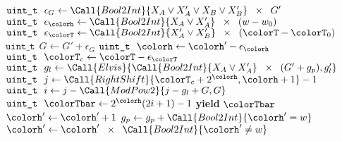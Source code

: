\begin{algorithm}[H]
\begin{minipage}{0.55\textwidth}
\begin{algorithmic}[1]
        \Statex
        \Statex {}
        \State $\texttt{uint\_t} ~ ~ \epsilon_G \gets \Call{Bool2Int}{X_A \vee X_A' \vee X_B \vee X_B'} \;\; \times \;\; G'$ 
        \State $\texttt{uint\_t} ~ ~ \epsilon_{\colorh} \gets \Call{Bool2Int}{X_A \vee X_A'} \;\; \times \;\; (w - w_0)$
        \State $\texttt{uint\_t} ~ ~ \epsilon_{\colorT} \gets \Call{Bool2Int}{X_A' \vee X_B'} \;\; \times \;\; (\colorT - \colorT_0)$ 
        \Statex
        \State $\texttt{uint\_t} ~ ~ G \gets G' + \epsilon_G$
        \State $\texttt{uint\_t} ~ ~ \colorh \gets \colorh' - \epsilon_{\colorh}$
        \State $\texttt{uint\_t} ~ ~ \colorT_c \gets \colorT - \epsilon_{\colorT}$
        \State $\texttt{uint\_t} ~ ~ g_l \gets \Call{Elvis}{\Call{Bool2Int}{X_A \vee X_A'} \;\; \times \;\; (G' + g_p), g_l'}$
        \Statex
        \Statex {}
        \State $\texttt{uint\_t} ~ ~ j \gets \Call{RightShift}{\colorT_c + 2^{\colorh}, \colorh + 1} - 1$ 
        \State $\texttt{uint\_t} ~ ~ i \gets j - \Call{ModPow2}{j - g_l + G, G}$ 
        \Statex {}
        \State $\texttt{uint\_t} ~ ~ \colorTbar \gets 2^{\colorh}(2i + 1) - 1$ 
        \State \textbf{yield} $\colorTbar$
        \Statex
        \Statex {}
        \State $\colorh' \gets \colorh' + 1$ 
        \State $g_p \gets g_p + \Call{Bool2Int}{\colorh' = w}$ 
        \State $\colorh' \gets \colorh' \;\; \times \;\; \Call{Bool2Int}{\colorh' \neq w}$ 
        \EndFor
    \EndFunction
    \end{algorithmic}
\end{minipage}
\end{algorithm}
